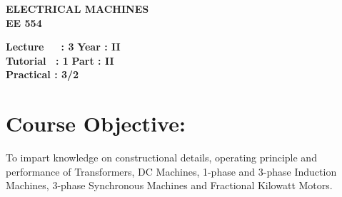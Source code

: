 \begin{center}
    \textbf{\huge{\uppercase{Electrical Machines}}}
    \\
    \vspace{.5cm}
    \textbf{\large{EE 554}}
\end{center}

\noindent\textbf{Lecture\ \ \ : 3} \hfill \textbf{Year : II } \\
\textbf{Tutorial \ : 1} \hfill \textbf{Part : II } \\
\textbf{Practical : 3/2}  \\

\par
\noindent 
\section*{Course Objective:}
To impart knowledge on constructional details, operating principle and performance of Transformers, DC Machines, 1-phase and 3-phase Induction Machines, 3-phase Synchronous Machines and Fractional Kilowatt Motors.

